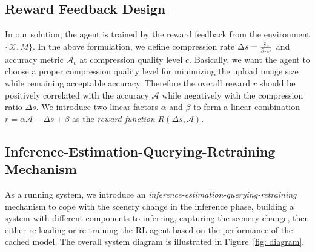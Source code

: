 
\subsection{Reward Feedback Design}
\label{subsec: reward}

In our solution, the agent is trained by the reward feedback from the environment $ \{\mathcal{X}, M\} $. In the above formulation, we define compression rate {\color{revise2}$ \Delta s = \frac{\hat{s}_c}{\hat{s}_{\rm ref}} $} and accuracy metric $ \mathcal{A}_c $ at compression quality level $ c $. Basically, we want the agent to choose a proper compression quality level for minimizing the upload image size while remaining acceptable accuracy. \textcolor{revise}{Therefore the overall reward $ r $ should be positively correlated with the accuracy $ \mathcal{A} $ while negatively with the compression ratio $ \Delta s $.} We introduce two linear factors $ \alpha $ and $ \beta $ to form a linear combination $ r = \alpha \mathcal{A} - \Delta s + \beta $ as the \emph{reward function} $ R(\Delta s, \mathcal{A}) $. %

\subsection{Inference-Estimation-Querying-Retraining Mechanism}
\label{subsec: mechanism}
As a running system, we introduce an \emph{inference-estimation-querying-retraining} mechanism to cope with the scenery change in the inference phase, building a system with different components to inferring, capturing the scenery change, then either re-loading or re-training the RL agent based on the performance of the cached model. The overall system diagram is illustrated in Figure~\ref{fig: diagram}.


